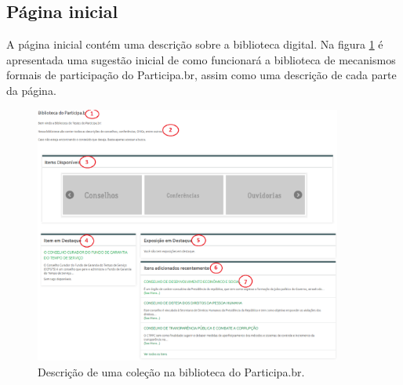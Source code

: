 \subsection*{Página inicial}

A página inicial contém uma descrição sobre a biblioteca digital. Na figura \ref{fig:inicial_prototipo} é apresentada uma sugestão inicial de como funcionará a biblioteca de mecanismos formais de participação do Participa.br, assim como uma descrição de cada parte da página.

\graphicspath{{figuras/prototipo/}}
\begin{figure}[H]
\centering
\includegraphics[width=0.9\textwidth]{pagina-inicial}
\caption{Descrição de uma coleção na biblioteca do Participa.br.}
\label{fig:inicial_prototipo}
\end{figure}

